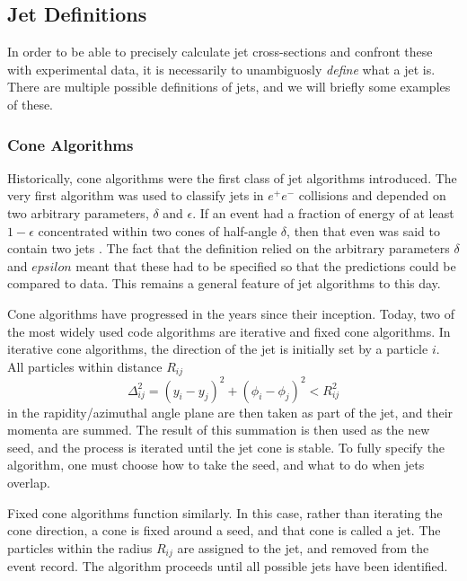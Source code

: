 \documentclass[10pt,a4paper]{book}
\begin{document}
\subsection{Jet Definitions}
In order to be able to precisely calculate jet cross-sections and confront these with experimental data, it is necessarily to unambiguosly \emph{define} what a jet is. There are multiple possible definitions of jets, and we will briefly some examples of these.  

\subsubsection{Cone Algorithms}
Historically, cone algorithms were the first class of jet algorithms introduced. The very first algorithm was used to classify jets in $e^+e^-$ collisions and depended on two arbitrary parameters, $\delta$ and $\epsilon$. If an event had a fraction of energy of at least $1 - \epsilon$ concentrated within two cones of half-angle $\delta$, then that even was said to contain two jets \cite{Sterman:1977wj}. The fact that the definition relied on the arbitrary parameters $\delta$ and $epsilon$ meant that these had to be specified so that the predictions could be compared to data. This remains a general feature of jet algorithms to this day.

Cone algorithms have progressed in the years since their inception. Today, two of the most widely used code algorithms are iterative and fixed cone algorithms. In iterative cone algorithms, the direction of the jet is initially set by a particle $i$. All particles within distance $R_{ij}$
\begin{equation}
\Delta_{ij}^2 = (y_i - y_j)^2 + (\phi_i - \phi_j)^2 < R_{ij}^2 
\end{equation}
in the rapidity/azimuthal angle plane are then taken as part of the jet, and their momenta are summed. The result of this summation is then used as the new seed, and the process is iterated until the jet cone is stable. To fully specify the algorithm, one must choose how to take the seed, and what to do when jets overlap. 

Fixed cone algorithms function similarly. In this case, rather than iterating the cone direction, a cone is fixed around a seed, and that cone is called a jet. The particles within the radius $R_{ij}$ are assigned to the jet, and removed from the event record. The algorithm proceeds until all possible jets have been identified.
\end{document}
